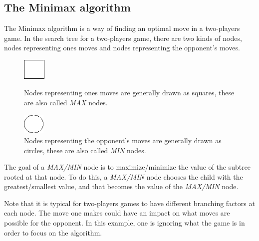 \label{second part}
\subsection{The Minimax algorithm}
The Minimax algorithm is a way of finding an optimal move in a two-players game. In the search tree for a two-players game, there are two kinds of nodes, nodes representing ones moves and nodes representing the opponent's moves.\cite{graphics_minimax}
\begin{figure}[H]
\centering
	\begin{minipage}[b]{0.45\linewidth}
		\centering
		\includegraphics[height=1cm]{3Algorithms/3.2Algorithm_MCTS_Benoit/img/max.png}
		\caption{\label{fig:max}Nodes representing ones moves are generally drawn as squares, these are also called \emph{MAX} nodes.}
	\end{minipage}%
	\hspace*{1cm}
	\begin{minipage}[b]{0.45\linewidth}
		\centering
		\includegraphics[height=1cm]{3Algorithms/3.2Algorithm_MCTS_Benoit/img/min.png}
		\caption{\label{fig:min}Nodes representing the opponent's moves are generally drawn as circles, these are also called \emph{MIN} nodes.}
	\end{minipage}%
\end{figure}

The goal of a \emph{MAX/MIN} node is to maximize/minimize the value of the subtree rooted at that node. To do this, a \emph{MAX/MIN} node chooses the child with the greatest/smallest value, and that becomes the value of the \emph{MAX/MIN} node.

Note that it is typical for two-players games to have different branching factors at each node. The move one makes could have an impact on what moves are possible for the opponent. In this example, one is ignoring what the game is in order to focus on the algorithm.

